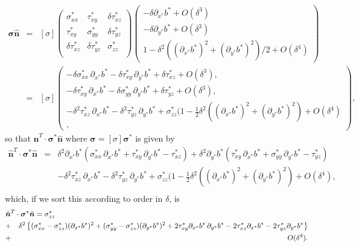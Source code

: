 \documentclass[10pt,a4paper]{book}
\newcommand{\p}{\partial}
\newcommand{\de}{\delta}
\newcommand{\txy}{\tau_{xy}}
\newcommand{\txz}{\tau_{xz}}
\newcommand{\tyz}{\tau_{yz}}
\newcommand{\sxx}{\sigma_{xx}}
\newcommand{\syy}{\sigma_{yy}}
\newcommand{\szz}{\sigma_{zz}}
\newcommand{\normal}{\hat{\bm{n}}}
\begin{document}
 \begin{eqnarray}
 \bm{\sigma} \hat{\bm{n}}&=& [\sigma]
\left ( \begin{array}{ccc} 
 \sxx^* & \txy^* & \de \txz^* \\
 \txy^* & \syy^* & \de \tyz^* \\
 \de \txz^* & \de \tyz^* & \szz^* \\
 \end{array} \right )
      \left ( \begin{array}{c} -\de \p_{x^*} b^* +O(\de^3) \\ 
          -\de \p_{y^*} b^* +O(\de^3) \\ 
         1 -\de^2 ((\p_{x^*} b^*)^2+(\p_{y^*} b^*)^2)/2 +O(\de^4)
 \end{array} \right )
\nonumber \\
 &=& [\sigma] \left (\begin{array}{c}
 -\de \sxx^* \, \p_{x^*} b^* - \de \txy^* \, \p_{y^*} b^* + \de \txz^* +O(\de^3),\\
 -\de \txy^* \, \p_{x^*} b^* - \de \syy^* \, \p_{y^*} b^* + \de \tyz^* +O(\de^3),\\
 -\de^2 \txz^* \, \p_{x^*} b^* - \de^2 \tyz^* \, \p_{y^*} b^* 
+ \szz^* ( 1-\frac{1}{2}\de^2 ((\p_{x^*} b^*)^2+(\p_{y^*} b^*)^2)  +O(\de^4)\\,
 \end{array} \right ), \label{eq:sn}
 \end{eqnarray}
so that $\normal^T \cdot \bm{\sigma}^* \normal$ where  
$\bm{\sigma}=[\sigma]\bm{\sigma}^*$ is given by
 \begin{eqnarray*}
 \normal^T \cdot \bm{\sigma}^* \normal&=&
   \de^2 \p_{x^*} b^*  ( \sxx^* \, \p_{x^*} b^* +  \txy^* \, \p_{y^*} b^* -  \txz^*) 
+ \de^2 \p_{y^*} b^*  ( \txy^* \, \p_{x^*} b^* +  \syy^* \, \p_{y^*} b^* -  \tyz^*) \\
& & -  \de^2 \txz^* \, \p_{x^*} b^* - \de^2 \tyz^* \, \p_{y^*} b^* + 
\szz^*  ( 1-\frac{1}{2}\de^2 ((\p_{x^*} b^*)^2+(\p_{y^*} b^*)^2) +O(\de^4) , \\
\end{eqnarray*}
which, if we sort this according to order in $\de$, is
\begin{eqnarray*}
 \lefteqn{\normal^T \cdot \bm{\sigma}^* \normal= \szz^*}
 \\ &+& \de^2 \left \{ (\sxx^*-\szz^*)  (\p_{x^*} b^*)^2 
+ (\syy^*-\szz^*) (\p_{y^*} b^*)^2
+2\txy^*
 \p_{x^*} b^* \, \p_{y^*} b^* -2\txz^* \p_{x^*} b^* 
 -2\tyz^* \p_{y^*} b^*
 \right \} \\ &+&
 O(\de^4) .\end{eqnarray*} 
\end{document}
